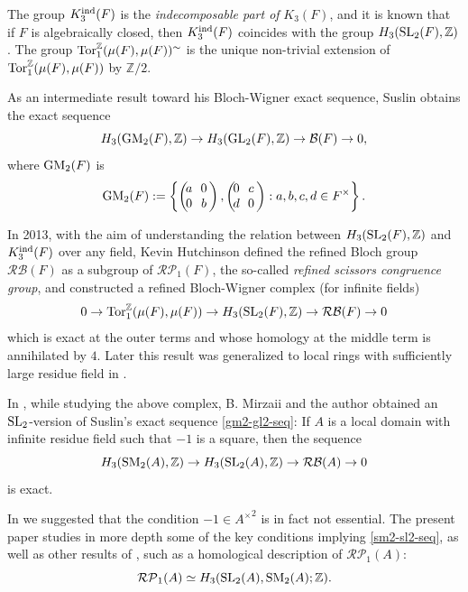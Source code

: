 \documentclass[11pt]{amsart}
\theoremstyle{definition}
\theoremstyle{plain}
\numberwithin{equation}{section}
\newcommand{\z}{\mathbb{Z}}
\newcommand{\BB}{\mathcal{B}}
\newcommand{\RP}{\mathcal{RP}}
\newcommand{\RB}{\mathcal{RB}}
\renewcommand{\aa}{{A^\times}}
\newcommand{\tors}{{{\rm Tor}_1^{\z}}}
\newcommand{\GE}{{\rm GE}}
\newcommand{\GL}{\mathit{{\rm GL}}}
\newcommand{\SL}{\mathit{{\rm SL}}}
\newcommand{\GM}{\mathit{{\rm GM}}}
\newcommand{\SM}{\mathit{{\rm SM}}}
\newcommand{\ind}{{\rm ind}}
\newcommand{\mtxx}[4]
{\left(\!\!
\begin{array}{cc}
\!\!#1 & \!\!#2\\
\!\!#3 & \!\!#4
\end{array}\!\!
\right)}
\begin{document}
The group $K^\ind_3(F)$ is the {\it indecomposable part of} $K_3(F)$, and it is known that if $F$ is algebraically closed, then $K^\ind_3(F)$ coincides with the group $H_3(\SL_2(F),\z)$. The group $\tors(\mu(F),\mu(F))^\sim$ is the unique non-trivial extension of $\tors(\mu(F),\mu(F))$ by $\z/2$. 

As an intermediate result toward his Bloch-Wigner exact sequence, Suslin obtains the exact sequence
\begin{equation}\label{gm2-gl2-seq}
    H_3(\GM_2(F),\z)\to H_3(\GL_2(F),\z)\to \BB(F)\to 0, 
\end{equation}
where $\GM_2(F)$ is
\[
    \GM_2(F):=\left\{\mtxx{a}{0}{0}{b},\mtxx{0}{c}{d}{0}:a,b,c,d\in F^\times\right\}.   
\]
 
 In 2013, with the aim of understanding the relation between $H_3(\SL_2(F),\z)$ and $K_3^\ind(F)$ over any field, Kevin Hutchinson \cite{hutchinson-2013} defined the refined Bloch group $\RB(F)$ as a subgroup of $\RP_1(F)$, the so-called {\it refined scissors congruence group}, and constructed a refined Bloch-Wigner complex (for infinite fields)
\[
    0\to \tors(\mu(F),\mu(F))\to H_3(\SL_2(F),\z)\to\RB(F)\to 0
\]
which is exact at the outer terms and whose homology at the middle term is annihilated by $4$.
Later this result was generalized to local rings with sufficiently large residue field in \cite{hutchinson2017}. 

In \cite{B-E--2023}, while studying the above complex, B. Mirzaii and the author obtained an $\SL_2$-version of 
Suslin's exact sequence \eqref{gm2-gl2-seq}: If $A$ is a local domain with infinite residue field such that
$-1$ is a square, then the sequence
\begin{equation}\label{sm2-sl2-seq}
    H_3(\SM_2(A),\z)\to H_3(\SL_2(A),\z)\to\RB(A)\to 0
\end{equation}
is exact.

In \cite[Remark 6.7]{B-E--2023} we suggested that the condition $-1\in\aa^2$ is in fact not essential.
The present paper studies in more depth some of the key conditions implying \eqref{sm2-sl2-seq}, as well as other results of \cite{B-E--2023}, such as
a homological description of $\RP_1(A)$:
\begin{equation}\label{sl2-sm2-rel}
\RP_1(A)\simeq H_3(\SL_2(A),\SM_2(A);\z).
\end{equation}
\end{document}
